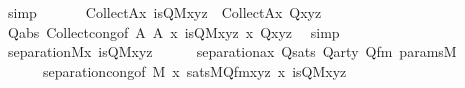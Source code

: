 \begin{isabellebody}
\ simp\isanewline
\ \ \isamarkupfalse%
\isanewline
\ \ \isamarkupfalse%
\ {}{\isacharcolon}{\kern0pt}{\isachardoublequoteopen}Collect{\isacharparenleft}{\kern0pt}A{\isacharcomma}{\kern0pt}{\isasymlambda}x{\isachardot}{\kern0pt}\ is{\isacharunderscore}{\kern0pt}Q{\isacharparenleft}{\kern0pt}{\isacharhash}{\kern0pt}{\isacharhash}{\kern0pt}M{\isacharcomma}{\kern0pt}x{\isacharcomma}{\kern0pt}y{\isacharcomma}{\kern0pt}z{\isacharparenright}{\kern0pt}{\isacharparenright}{\kern0pt}\ {\isacharequal}{\kern0pt}\ Collect{\isacharparenleft}{\kern0pt}A{\isacharcomma}{\kern0pt}{\isasymlambda}x{\isachardot}{\kern0pt}\ Q{\isacharparenleft}{\kern0pt}x{\isacharcomma}{\kern0pt}y{\isacharcomma}{\kern0pt}z{\isacharparenright}{\kern0pt}{\isacharparenright}{\kern0pt}{\isachardoublequoteclose}\ \isanewline
\ \ \ \ \isamarkupfalse%
\ Qabs\ Collect{\isacharunderscore}{\kern0pt}cong{\isacharbrackleft}{\kern0pt}of\ {\isachardoublequoteopen}A{\isachardoublequoteclose}\ {\isachardoublequoteopen}A{\isachardoublequoteclose}\ {\isachardoublequoteopen}{\isasymlambda}x{\isachardot}{\kern0pt}\ is{\isacharunderscore}{\kern0pt}Q{\isacharparenleft}{\kern0pt}{\isacharhash}{\kern0pt}{\isacharhash}{\kern0pt}M{\isacharcomma}{\kern0pt}x{\isacharcomma}{\kern0pt}y{\isacharcomma}{\kern0pt}z{\isacharparenright}{\kern0pt}{\isachardoublequoteclose}\ {\isachardoublequoteopen}{\isasymlambda}x{\isachardot}{\kern0pt}\ Q{\isacharparenleft}{\kern0pt}x{\isacharcomma}{\kern0pt}y{\isacharcomma}{\kern0pt}z{\isacharparenright}{\kern0pt}{\isachardoublequoteclose}{\isacharbrackright}{\kern0pt}\ \isamarkupfalse%
\ simp\isanewline
\ \ \isamarkupfalse%
\ {\isachardoublequoteopen}separation{\isacharparenleft}{\kern0pt}{\isacharhash}{\kern0pt}{\isacharhash}{\kern0pt}M{\isacharcomma}{\kern0pt}{\isasymlambda}x{\isachardot}{\kern0pt}\ is{\isacharunderscore}{\kern0pt}Q{\isacharparenleft}{\kern0pt}{\isacharhash}{\kern0pt}{\isacharhash}{\kern0pt}M{\isacharcomma}{\kern0pt}x{\isacharcomma}{\kern0pt}y{\isacharcomma}{\kern0pt}z{\isacharparenright}{\kern0pt}{\isacharparenright}{\kern0pt}{\isachardoublequoteclose}\isanewline
\ \ \ \ \isamarkupfalse%
\ separation{\isacharunderscore}{\kern0pt}ax\ Qsats\ Qarty\ Qfm\ params{\isacharunderscore}{\kern0pt}M\isanewline
\ \ \ \ \ \ separation{\isacharunderscore}{\kern0pt}cong{\isacharbrackleft}{\kern0pt}of\ {\isachardoublequoteopen}{\isacharhash}{\kern0pt}{\isacharhash}{\kern0pt}M{\isachardoublequoteclose}\ {\isachardoublequoteopen}{\isasymlambda}x{\isachardot}{\kern0pt}\ sats{\isacharparenleft}{\kern0pt}M{\isacharcomma}{\kern0pt}Q{\isacharunderscore}{\kern0pt}fm{\isacharcomma}{\kern0pt}{\isacharbrackleft}{\kern0pt}x{\isacharcomma}{\kern0pt}y{\isacharcomma}{\kern0pt}z{\isacharbrackright}{\kern0pt}{\isacharparenright}{\kern0pt}{\isachardoublequoteclose}\ {\isachardoublequoteopen}{\isasymlambda}x{\isachardot}{\kern0pt}\ is{\isacharunderscore}{\kern0pt}Q{\isacharparenleft}{\kern0pt}{\isacharhash}{\kern0pt}{\isacharhash}{\kern0pt}M{\isacharcomma}{\kern0pt}x{\isacharcomma}{\kern0pt}y{\isacharcomma}{\kern0pt}z{\isacharparenright}{\kern0pt}{\isachardoublequoteclose}{\isacharbrackright}{\kern0pt}\isanewline

\end{isabellebody}
